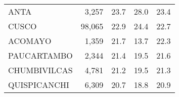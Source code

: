 \begin{tabular}{lrrrr}
	\cellcolor[HTML]{FD6864}ANTA                                            & 3,257                                                                 & 23.7                                                                             & 28.0                                                                        & 23.4                                                                                \\
	\cellcolor[HTML]{FD6864}CUSCO                                           & 98,065                                                                & 22.9                                                                             & 24.4                                                                        & 22.7                                                                                \\
	\cellcolor[HTML]{FD6864}ACOMAYO                                         & 1,359                                                                 & 21.7                                                                             & 13.7                                                                        & 22.3                                                                                \\
	\cellcolor[HTML]{FD6864}PAUCARTAMBO                                     & 2,344                                                                 & 21.4                                                                             & 19.5                                                                        & 21.6                                                                                \\
	\cellcolor[HTML]{FD6864}CHUMBIVILCAS                                    & 4,781                                                                 & 21.2                                                                             & 19.5                                                                        & 21.3                                                                                \\
	\cellcolor[HTML]{FD6864}QUISPICANCHI                                    & 6,309                                                                 & 20.7                                                                             & 18.8                                                                        & 20.9                                                                                \\

\end{tabular}

